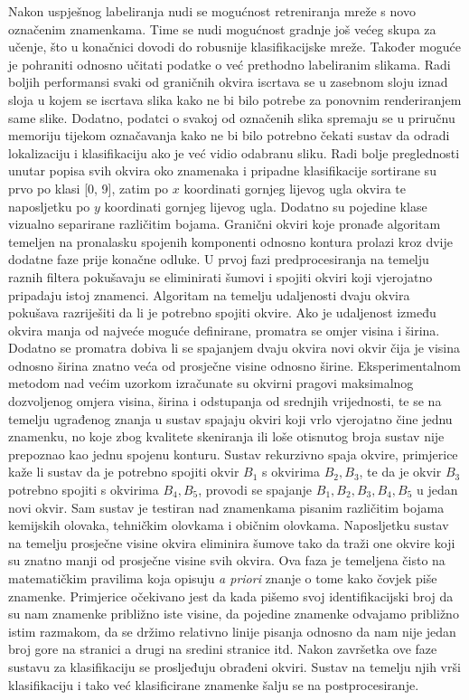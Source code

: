 \documentclass[times, utf8, diplomski]{fer}
\theoremstyle{definition}
\begin{document}
Nakon uspješnog labeliranja nudi se mogućnost retreniranja mreže s novo označenim znamenkama. Time se nudi mogućnost gradnje još većeg skupa za učenje, što u konačnici dovodi do robusnije klasifikacijske mreže. Također moguće je pohraniti odnosno učitati podatke o već prethodno labeliranim slikama. Radi boljih performansi svaki od graničnih okvira iscrtava se u zasebnom sloju iznad sloja u kojem se iscrtava slika kako ne bi bilo potrebe za ponovnim renderiranjem same slike. Dodatno, podatci o svakoj od označenih slika spremaju se u priručnu memoriju tijekom označavanja kako ne bi bilo potrebno čekati sustav da odradi lokalizaciju i klasifikaciju ako je već vidio odabranu sliku. Radi bolje preglednosti unutar popisa svih okvira oko znamenaka i pripadne klasifikacije sortirane su prvo po klasi [0, 9], zatim po $x$ koordinati gornjeg lijevog ugla okvira te naposljetku po $y$ koordinati gornjeg lijevog ugla. Dodatno su pojedine klase vizualno separirane različitim bojama. \newline
Granični okviri koje pronađe algoritam temeljen na pronalasku spojenih komponenti odnosno kontura prolazi kroz dvije dodatne faze prije konačne odluke. U prvoj fazi predprocesiranja na temelju raznih filtera pokušavaju se eliminirati šumovi i spojiti okviri koji vjerojatno pripadaju istoj znamenci. Algoritam na temelju udaljenosti dvaju okvira pokušava razriješiti da li je potrebno spojiti okvire. Ako je udaljenost između okvira manja od najveće moguće definirane, promatra se omjer visina i širina. Dodatno se promatra dobiva li se spajanjem dvaju okvira novi okvir čija je visina odnosno širina znatno veća od prosječne visine odnosno širine. Eksperimentalnom metodom nad većim uzorkom izračunate su okvirni pragovi maksimalnog dozvoljenog omjera visina, širina i odstupanja od srednjih vrijednosti, te se na temelju ugrađenog znanja u sustav spajaju okviri koji vrlo vjerojatno čine jednu znamenku, no koje zbog kvalitete skeniranja ili loše otisnutog broja sustav nije prepoznao kao jednu spojenu konturu. Sustav rekurzivno spaja okvire, primjerice kaže li sustav da je potrebno spojiti okvir $B_1$ s okvirima $B_2, B_3$, te da je okvir $B_3$ potrebno spojiti s okvirima $B_4, B_5$, provodi se spajanje $B_1, B_2, B_3, B_4, B_5$ u jedan novi okvir. Sam sustav je testiran nad znamenkama pisanim različitim bojama kemijskih olovaka, tehničkim olovkama i običnim olovkama. Naposljetku sustav na temelju prosječne visine okvira eliminira šumove tako da traži one okvire koji su znatno manji od prosječne visine svih okvira. Ova faza je temeljena čisto na matematičkim pravilima koja opisuju \textit{a priori} znanje o tome kako čovjek piše znamenke. Primjerice očekivano jest da kada pišemo svoj identifikacijski broj da su nam znamenke približno iste visine, da pojedine znamenke odvajamo približno istim razmakom, da se držimo relativno linije pisanja odnosno da nam nije jedan broj gore na stranici a drugi na sredini stranice itd. Nakon završetka ove faze sustavu za klasifikaciju se prosljeđuju obrađeni okviri. Sustav na temelju njih vrši klasifikaciju i tako već klasificirane znamenke šalju se na postprocesiranje. \newline
\end{document}
